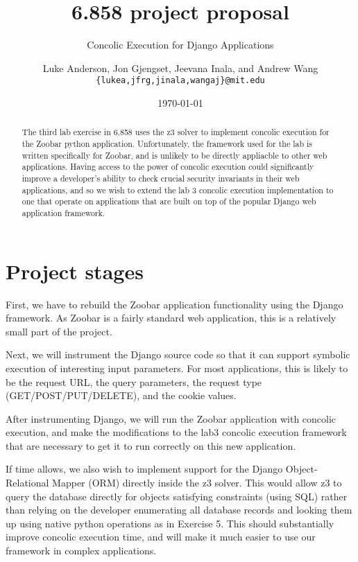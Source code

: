 \documentclass[a4page]{scrartcl}
\author{Luke Anderson, Jon Gjengset, Jeevana Inala, and Andrew Wang \\
	\texttt{\{lukea,jfrg,jinala,wangaj\}@mit.edu}
}
\title{6.858 project proposal}
\subtitle{Concolic Execution for Django Applications}
\date{\today}
\begin{document}
\maketitle

\begin{abstract}
The third lab exercise in 6.858 uses the z3 solver to implement concolic
execution for the Zoobar python application. Unfortunately, the framework used
for the lab is written specifically for Zoobar, and is unlikely to be directly
appliacble to other web applications. Having access to the power of concolic
execution could significantly improve a developer's ability to check crucial
security invariants in their web applications, and so we wish to extend the lab
3 concolic execution implementation to one that operate on applications that
are built on top of the popular Django web application framework.
\end{abstract}

\section{Project stages}
First, we have to rebuild the Zoobar application functionality using the Django
framework. As Zoobar is a fairly standard web application, this is a relatively
small part of the project.

Next, we will instrument the Django source code so that it can support symbolic
execution of interesting input parameters. For most applications, this is
likely to be the request URL, the query parameters, the request type
(GET/POST/PUT/DELETE), and the cookie values.

After instrumenting Django, we will run the Zoobar application with concolic
execution, and make the modifications to the lab3 concolic execution framework
that are necessary to get it to run correctly on this new application.

If time allows, we also wish to implement support for the Django
Object-Relational Mapper (ORM) directly inside the z3 solver. This would allow
z3 to query the database directly for objects satisfying constraints (using
SQL) rather than relying on the developer enumerating all database records and
looking them up using native python operations as in Exercise 5. This should
substantially improve concolic execution time, and will make it much easier to
use our framework in complex applications.
\end{document}
